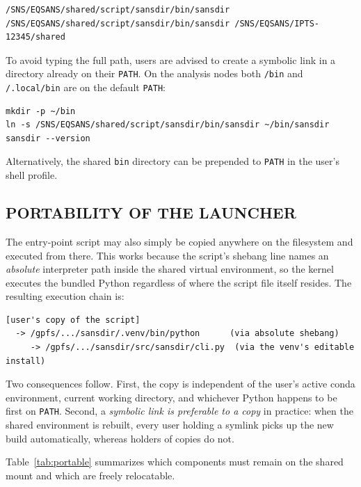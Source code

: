 \documentclass[tm]{ornltm}
\newcommand{\hme}{\raisebox{0.4ex}{\texttildelow}}
\begin{document}
\begin{lstlisting}[language=shellsession]
/SNS/EQSANS/shared/script/sansdir/bin/sansdir
/SNS/EQSANS/shared/script/sansdir/bin/sansdir /SNS/EQSANS/IPTS-12345/shared
\end{lstlisting}

To avoid typing the full path, users are advised to create a symbolic link in a
directory already on their \texttt{PATH}. On the analysis nodes both
\texttt{\hme/bin} and \texttt{\hme/.local/bin} are on the default \texttt{PATH}:

\begin{lstlisting}[language=shellsession]
mkdir -p ~/bin
ln -s /SNS/EQSANS/shared/script/sansdir/bin/sansdir ~/bin/sansdir
sansdir --version
\end{lstlisting}

Alternatively, the shared \texttt{bin} directory can be prepended to
\texttt{PATH} in the user's shell profile.

\subsection{PORTABILITY OF THE LAUNCHER}

The entry-point script may also simply be copied anywhere on the filesystem and
executed from there. This works because the script's shebang line names an
\emph{absolute} interpreter path inside the shared virtual environment, so the
kernel executes the bundled Python regardless of where the script file itself
resides. The resulting execution chain is:

\begin{lstlisting}
[user's copy of the script]
  -> /gpfs/.../sansdir/.venv/bin/python      (via absolute shebang)
     -> /gpfs/.../sansdir/src/sansdir/cli.py  (via the venv's editable install)
\end{lstlisting}

Two consequences follow. First, the copy is independent of the user's active
conda environment, current working directory, and whichever Python happens to be
first on \texttt{PATH}. Second, a \emph{symbolic link is preferable to a copy}
in practice: when the shared environment is rebuilt, every user holding a symlink
picks up the new build automatically, whereas holders of copies do not.

Table~\ref{tab:portable} summarizes which components must remain on the shared
mount and which are freely relocatable.
\end{document}
